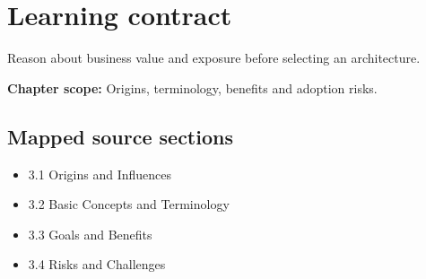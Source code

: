 \documentclass[10pt,letterpaper]{article}
\begin{document}
\sourceStatement
\tableofcontents
\newpage
\section{Learning contract}
\begin{takeaway}
Reason about business value and exposure before selecting an architecture.
\end{takeaway}
\textbf{Chapter scope:} Origins, terminology, benefits and adoption risks.\\
\subsection{Mapped source sections}
\begin{itemize}
\item 3.1 Origins and Influences
\item 3.2 Basic Concepts and Terminology
\item 3.3 Goals and Benefits
\item 3.4 Risks and Challenges
\end{itemize}
\end{document}
